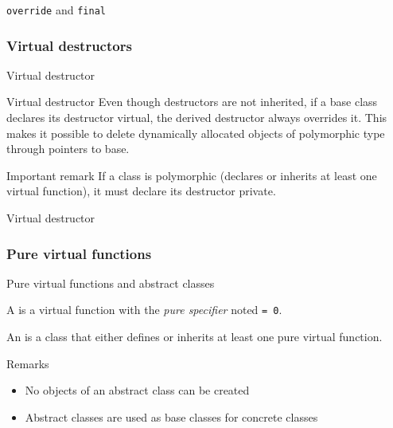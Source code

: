 \begin{frame}{\texttt{override} and \texttt{final}}{}
  \begin{example}
  \end{example}
\end{frame}

\subsubsection{Virtual destructors}

\begin{frame}{Virtual destructor}{}
  \begin{block}{Virtual destructor}
    Even though destructors are not inherited, if a base class declares its destructor virtual, the derived destructor always overrides it. This makes it possible to delete dynamically allocated objects of polymorphic type through pointers to base.
  \end{block}
  \begin{block}{Important remark}
    If a class is polymorphic (declares or inherits at least one virtual function), it must declare its destructor private.
  \end{block}
\end{frame}

\begin{frame}{Virtual destructor}{}
  \begin{example}
  \end{example}
\end{frame}

\subsubsection{Pure virtual functions}

\begin{frame}{Pure virtual functions and abstract classes}{}
  \begin{definition}
    A  is a virtual function with the \emph{pure specifier} noted \lstinline!= 0!.
  \end{definition}

  \begin{definition}
    An  is a class that either defines or inherits at least one pure virtual function.
  \end{definition}

  \begin{block}{Remarks}
    \begin{itemize}
    \item
      No objects of an abstract class can be created
    \item
      Abstract classes are used as base classes for concrete classes
    \end{itemize}
  \end{block}
\end{frame}

